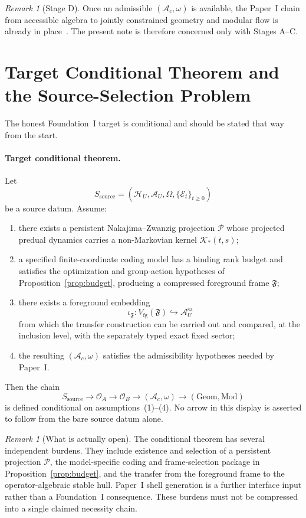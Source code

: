 \documentclass[12pt]{article}
\theoremstyle{definition}
\theoremstyle{remark}
\newtheorem{remark}[theorem]{Remark}
\begin{document}
\begin{remark}[Stage D]
Once an admissible \((\mathcal A_c,\omega)\) is available, the
Paper~I chain from accessible algebra to jointly constrained geometry
and modular flow is already in place~\cite{PaperI}. The present note is
therefore concerned only with Stages A--C.
\end{remark}

\section{Target Conditional Theorem and the Source-Selection Problem}\label{sec:target}

The honest Foundation~I target is conditional and should be stated that
way from the start.

\paragraph{Target conditional theorem.}
Let
\[
S_{\mathrm{source}}
=
(\mathcal H_U,\mathcal A_U,\Omega,\{\mathcal E_t\}_{t\ge 0})
\]
be a source datum. Assume:
\begin{enumerate}
\item there exists a persistent Nakajima--Zwanzig projection
  \(\mathcal P\) whose projected predual dynamics carries a
  non-Markovian kernel \(\mathcal K_*(t,s)\);
\item a specified finite-coordinate coding model has a binding rank
  budget and satisfies the optimization and group-action hypotheses of
  Proposition~\ref{prop:budget}, producing a compressed foreground frame
  \(\mathfrak F\);
\item there exists a foreground embedding
  \[
  \iota_{\mathfrak F}:V_{\mathrm{fg}}(\mathfrak F)\hookrightarrow
  \mathcal A_U^{\mathrm{sa}}
  \]
  from which the transfer construction can be carried out and compared,
  at the inclusion level, with the separately typed exact fixed sector;
\item the resulting \((\mathcal A_c,\omega)\) satisfies the
  admissibility hypotheses needed by Paper~I.
\end{enumerate}
Then the chain
\[
S_{\mathrm{source}}
\to
\mathcal O_A
\to
\mathcal O_B
\to
(\mathcal A_c,\omega)
\to
(\mathrm{Geom},\mathrm{Mod})
\]
is defined conditional on assumptions~(1)--(4). No arrow in this display
is asserted to follow from the bare source datum alone.

\begin{remark}[What is actually open]
The conditional theorem has several independent burdens. They include
existence and selection of a persistent projection \(\mathcal P\), the
model-specific coding and frame-selection package in
Proposition~\ref{prop:budget}, and the transfer from the foreground frame
to the operator-algebraic stable hull. Paper~I shell generation is a
further interface input rather than a Foundation~I consequence. These
burdens must not be compressed into a single claimed necessity chain.
\end{remark}
\end{document}
